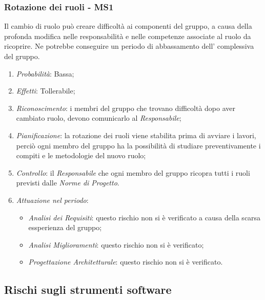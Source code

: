 \subsubsection{Rotazione dei ruoli - MS1}
Il cambio di ruolo pu\`o creare difficolt\`a ai componenti del gruppo, a causa della profonda modifica nelle responsabilit\`a e nelle competenze associate al ruolo da ricoprire. Ne potrebbe conseguire un periodo di abbassamento dell' complessiva del gruppo.
\begin{enumerate}
\item \textit{Probabilit\`a}: Bassa;
\item \textit{Effetti}: Tollerabile;
\item \textit{Riconoscimento}: i membri del gruppo che trovano difficoltà dopo aver cambiato ruolo, devono comunicarlo al \textit{Responsabile};
\item \textit{Pianificazione}: la rotazione dei ruoli viene stabilita prima di avviare i lavori, perci\`o ogni membro del gruppo ha la possibilit\`a di studiare preventivamente i compiti e le metodologie del nuovo ruolo;
\item \textit{Controllo}: il \textit{Responsabile}  che ogni membro del gruppo ricopra tutti i ruoli previsti dalle \textit{Norme di Progetto}.
\item \textit{Attuazione nel periodo}: 
	\begin{itemize}
	\item \textit{Analisi dei Requisiti}: questo rischio non si è verificato a causa della scarsa essperienza del gruppo;
	\item \textit{Analisi Miglioramenti}: questo rischio non si è verificato;
	\item \textit{Progettazione Architetturale}: questo rischio non si è verificato.
	\end{itemize}
\end{enumerate}

\subsection{Rischi sugli strumenti software}
